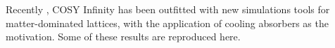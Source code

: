 \documentclass[portrait,a0paper,fontscale=0.285]{baposter} %
\begin{document}
\begin{poster}



{

Recently \cite{ipac2015}, COSY Infinity \cite{cosy} has been outfitted with new simulations tools for matter-dominated lattices, with the application of cooling absorbers as the motivation. Some of these results are reproduced here.
\\

}
\end{poster}
\end{document}
